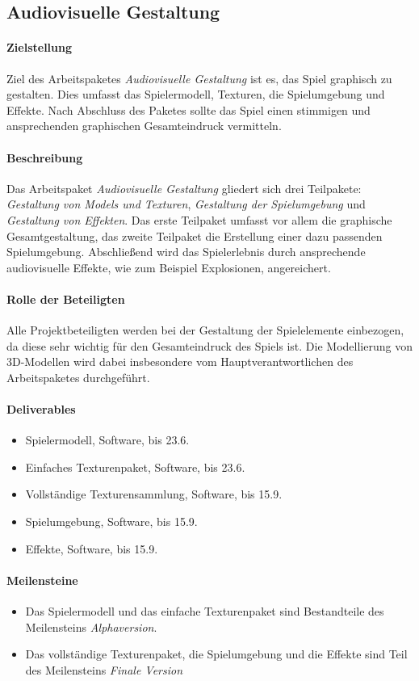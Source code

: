 \subsection{Audiovisuelle Gestaltung}

\paragraph{Zielstellung}\noindent
Ziel des Arbeitspaketes \textit{Audiovisuelle Gestaltung} ist es, das Spiel graphisch zu gestalten. Dies umfasst das Spielermodell, Texturen, die Spielumgebung und Effekte. Nach Abschluss des Paketes sollte das Spiel einen stimmigen und ansprechenden graphischen Gesamteindruck vermitteln.

\paragraph{Beschreibung}\noindent
Das Arbeitspaket \textit{Audiovisuelle Gestaltung} gliedert sich drei Teilpakete: \textit{Gestaltung von Models und Texturen}, \textit{Gestaltung der Spielumgebung} und \textit{Gestaltung von Effekten}. Das erste Teilpaket umfasst vor allem die graphische Gesamtgestaltung, das zweite Teilpaket die Erstellung einer dazu passenden Spielumgebung. Abschließend wird das Spielerlebnis durch ansprechende audiovisuelle Effekte, wie zum Beispiel Explosionen, angereichert.

\paragraph{Rolle der Beteiligten}\noindent
Alle Projektbeteiligten werden bei der Gestaltung der Spielelemente einbezogen, da diese sehr wichtig für den Gesamteindruck des Spiels ist. Die Modellierung von 3D-Modellen wird dabei insbesondere vom Hauptverantwortlichen des Arbeitspaketes durchgeführt.

\paragraph{Deliverables}\noindent
\begin{itemize}
\item Spielermodell, Software, bis 23.6.
\item Einfaches Texturenpaket, Software, bis 23.6.
\item Vollständige Texturensammlung, Software, bis 15.9.
\item Spielumgebung, Software, bis 15.9.
\item Effekte, Software, bis 15.9.
\end{itemize}

\paragraph{Meilensteine}\noindent
\begin{itemize}
\item Das Spielermodell und das einfache Texturenpaket sind Bestandteile des Meilensteins \textit{Alphaversion}.
\item Das vollständige Texturenpaket, die Spielumgebung und die Effekte sind Teil des Meilensteins \textit{Finale Version}
\end{itemize}